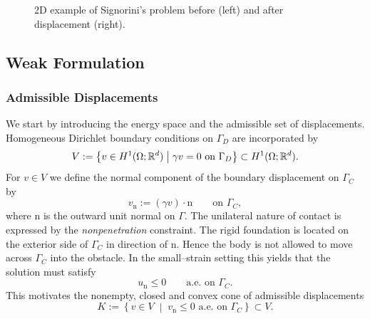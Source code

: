 \begin{figure}[!h]
	\centering
	
	\caption{2D example of Signorini's problem before (left) and after displacement (right).}
	\label{fig:setup}
\end{figure}

\subsection{Weak Formulation}

\subsubsection{Admissible Displacements}
We start by introducing the energy space and the admissible set of displacements.
Homogeneous Dirichlet boundary conditions on $\Gamma_D$ are incorporated by
\begin{equation}\label{eq:energyspace}
	V:=\left\{ v\in H^1(\Omega;{\mathbb R}^d)\;\middle|\; \gamma v=0 \text{ on }\Gamma_D\right\}\subset H^1(\Omega;{\mathbb R}^d).
\end{equation}
For $v\in V$ we define the normal component of the boundary displacement on $\Gamma_C$ by
\begin{equation}\label{eq:usualnormal}
	v_{\mathrm n} := (\gamma v)\cdot \mathrm n \qquad \text{on }\Gamma_C,
\end{equation}
where $\mathrm n$ is the outward unit normal on $\Gamma$. The unilateral nature of contact is expressed by the {\em nonpenetration} constraint. The rigid foundation is located on the exterior side of $\Gamma_C$ in direction of $\mathrm n$. Hence the body is not allowed to move across $\Gamma_C$ into the obstacle. In the small--strain setting this yields that the solution must satisfy
\begin{equation*}
	u_{\mathrm n}\le 0 \qquad \text{a.e.\ on }\Gamma_C.
\end{equation*}
This motivates the nonempty, closed and convex cone of admissible displacements
\begin{equation}\label{eq:admissible}
	K := \left\{ v\in V\;\middle|\; v_{\mathrm n}\le 0 \text{ a.e.\ on }\Gamma_C\right\}\subset V.
\end{equation}

